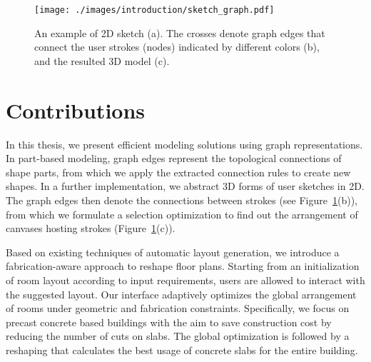 \begin{figure}[t!]\centering
  \texttt{[image: ./images/introduction/sketch\_graph.pdf]}
  \caption[An example of 2D sketch.]{An example of 2D sketch (a). The crosses denote graph edges that connect the user strokes (nodes) indicated by different colors (b), and the resulted 3D model (c).}
  \label{fig:intro_sketch_graph}
\end{figure}

\section{Contributions}

In this thesis, we present efficient modeling solutions using graph representations. In part-based modeling, graph edges represent the topological connections of shape parts, from which we apply the extracted connection rules to create new shapes. In a further implementation, we abstract 3D forms of user sketches in 2D. The graph edges then denote the connections between strokes (see Figure~\ref{fig:intro_sketch_graph}(b)), from which we formulate a selection optimization to find out the arrangement of canvases hosting strokes (Figure~\ref{fig:intro_sketch_graph}(c)).

Based on existing techniques of automatic layout generation, we introduce a fabrication-aware approach to reshape floor plans. Starting from an initialization of room layout according to input requirements, users are allowed to interact with the suggested layout. Our interface adaptively optimizes the global arrangement of rooms under geometric and fabrication constraints. Specifically, we focus on precast concrete based buildings with the aim to save construction cost by reducing the number of cuts on slabs. The global optimization is followed by a reshaping that calculates the best usage of concrete slabs for the entire building.

